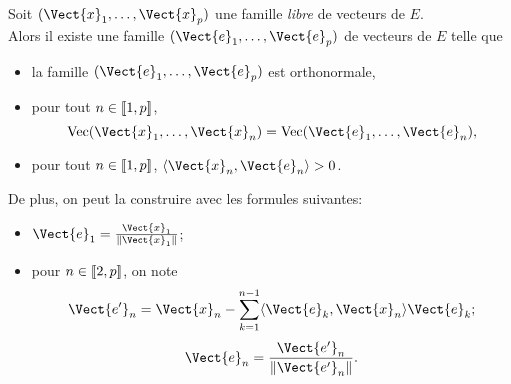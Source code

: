 \documentclass{book}
\begin{document}
\begin{Theoreme}
Soit $(\Vect{x}_1,\dots,\Vect{x}_p)$ une famille \emph{libre} de vecteurs de $E$.\\
Alors il existe une  famille $(\Vect{e}_1,\dots,\Vect{e}_p)$  de vecteurs de $E$
telle que
\begin{itemize}
\item la famille $(\Vect{e}_1,\dots,\Vect{e}_p)$ est orthonormale,
\item pour tout $n\in \mathopen\lbrack\!\lbrack1,p \mathclose\rbrack\!\rbrack$, \[ \text{Vec} (\Vect{x}_1,\dots,\Vect{x}_n) = \text{Vec} (\Vect{e}_1,\dots,\Vect{e}_n), \]
\item pour tout $n\in \mathopen\lbrack\!\lbrack1,p \mathclose\rbrack\!\rbrack$, $\PS{\Vect{x}_n}{\Vect{e}_n} > 0$.
\end{itemize}
De plus, on peut la construire avec les formules suivantes:
\begin{itemize}
\item $\Vect{e}_1 = \frac{\Vect{x}_1}{\norme{\Vect{x}_1}}$;
\item pour $n\in \mathopen\lbrack\!\lbrack2,p \mathclose\rbrack\!\rbrack$, on note
  \[ \Vect{e'}_n = \Vect{x}_n - \sum_{k=1}^{n-1} \PS{\Vect{e}_k}{\Vect{x}_n} \Vect{e}_k; \]
	\[\Vect{e}_n = \frac{\Vect{e'}_n}{\norme{\Vect{e'}_n}}.\]
\end{itemize}
\end{Theoreme}
\end{document}
